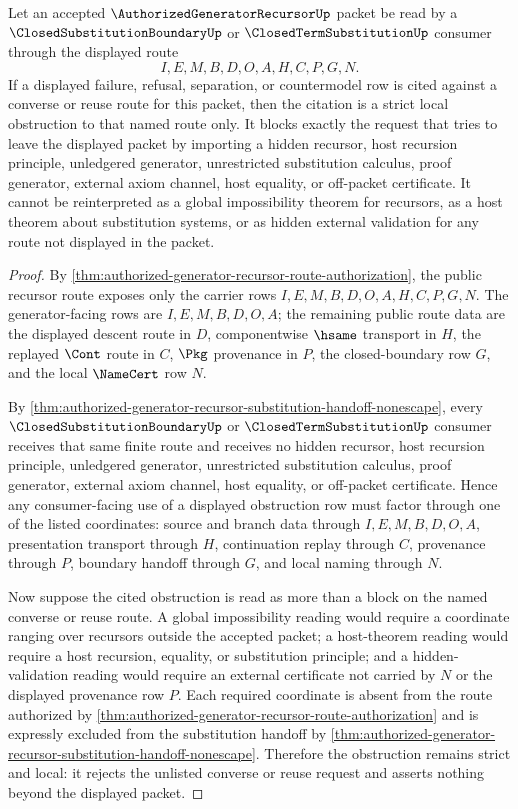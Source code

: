 \begin{corollary}
\label{cor:authorized-generator-recursor-route-authorization-obstruction-locality}
Let an accepted $\AuthorizedGeneratorRecursorUp$ packet be read by a $\ClosedSubstitutionBoundaryUp$ or $\ClosedTermSubstitutionUp$ consumer through the displayed route
$$
I,E,M,B,D,O,A,H,C,P,G,N.
$$
If a displayed failure, refusal, separation, or countermodel row is cited against a converse or reuse route for this packet, then the citation is a strict local obstruction to that named route only. It blocks exactly the request that tries to leave the displayed packet by importing a hidden recursor, host recursion principle, unledgered generator, unrestricted substitution calculus, proof generator, external axiom channel, host equality, or off-packet certificate. It cannot be reinterpreted as a global impossibility theorem for recursors, as a host theorem about substitution systems, or as hidden external validation for any route not displayed in the packet.
\end{corollary}
\begin{proof}
By \autoref{thm:authorized-generator-recursor-route-authorization}, the public recursor route exposes only the carrier rows $I,E,M,B,D,O,A,H,C,P,G,N$. The generator-facing rows are $I,E,M,B,D,O,A$; the remaining public route data are the displayed descent route in $D$, componentwise $\hsame$ transport in $H$, the replayed $\Cont$ route in $C$, $\Pkg$ provenance in $P$, the closed-boundary row $G$, and the local $\NameCert$ row $N$.

By \autoref{thm:authorized-generator-recursor-substitution-handoff-nonescape}, every $\ClosedSubstitutionBoundaryUp$ or $\ClosedTermSubstitutionUp$ consumer receives that same finite route and receives no hidden recursor, host recursion principle, unledgered generator, unrestricted substitution calculus, proof generator, external axiom channel, host equality, or off-packet certificate. Hence any consumer-facing use of a displayed obstruction row must factor through one of the listed coordinates: source and branch data through $I,E,M,B,D,O,A$, presentation transport through $H$, continuation replay through $C$, provenance through $P$, boundary handoff through $G$, and local naming through $N$.

Now suppose the cited obstruction is read as more than a block on the named converse or reuse route. A global impossibility reading would require a coordinate ranging over recursors outside the accepted packet; a host-theorem reading would require a host recursion, equality, or substitution principle; and a hidden-validation reading would require an external certificate not carried by $N$ or the displayed provenance row $P$. Each required coordinate is absent from the route authorized by \autoref{thm:authorized-generator-recursor-route-authorization} and is expressly excluded from the substitution handoff by \autoref{thm:authorized-generator-recursor-substitution-handoff-nonescape}. Therefore the obstruction remains strict and local: it rejects the unlisted converse or reuse request and asserts nothing beyond the displayed packet.
\end{proof}
